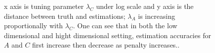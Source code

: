 \documentclass[fleqn]{article}
\begin{document}
\begin{figure}
\centering
{}
\caption{x axis is tuning parameter $\lambda_C$ under log scale and y axis is the distance between truth and estimations; $\lambda_A$ is increasing proportionally with $\lambda_C$. One can see that in both the low dimensional and hight dimensional setting, estimation accuracies for $A$ and $C$ first increase then decrease as penalty increases..}
\label{fig:low-high-d-sim}
\end{figure}
\end{document}

